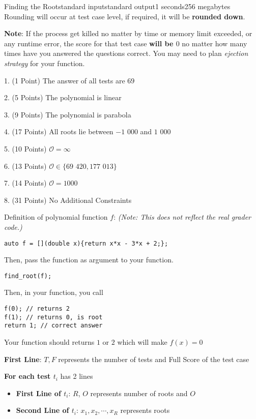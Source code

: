 \documentclass[11pt,a4paper]{article}
\begin{document}
\begin{problem}{Finding the Root}{standard input}{standard output}{1 seconds}{256 megabytes}
Rounding will occur at test case level, if required, it will be \textbf{rounded down}.

\textbf{Note}: If the process get killed no matter by time or memory limit exceeded,
or any runtime error, the score for that test case \textbf{will be $0$} no matter
how many times have you answered the questions correct. You may need to plan
\textit{ejection strategy} for your function.

\Subtasks

1. (1 Point) The answer of all tests are $69$

2. (5 Points) The polynomial is linear

3. (9 Points) The polynomial is parabola

4. (17 Points) All roots lie between $-1$ $000$ and $1$ $000$

5. (10 Points) $\mathcal{O} = \infty$

6. (13 Points) $\mathcal{O} \in \{69$ $420, 177$ $013\}$

7. (14 Points) $\mathcal{O} = 1000$

8. (31 Points) No Additional Constraints

\Ex

Definition of polynomial function $f$: \textit{(Note: This does not reflect the real grader code.)}

\begin{verbatim}
auto f = [](double x){return x*x - 3*x + 2;};
\end{verbatim}

Then, pass the function as argument to your function.

\begin{verbatim}
find_root(f);
\end{verbatim}

Then, in your function, you call

\begin{verbatim}
f(0); // returns 2
f(1); // returns 0, is root
return 1; // correct answer
\end{verbatim}

Your function should returns $1$ or $2$ which will make $f(x)=0$

\SampleGrader

\textbf{First Line}: $T, F$ represents the number of tests and Full Score of the test case

\textbf{For each test $t_i$} has 2 lines

\begin{itemize}
\item \textbf{First Line of $t_i$}: $R$, $O$ represents number of roots and $O$
\item \textbf{Second Line of $t_i$}: $x_1, x_2, \cdots, x_R$ represents roots
\end{itemize}

\end{problem}
\end{document}
